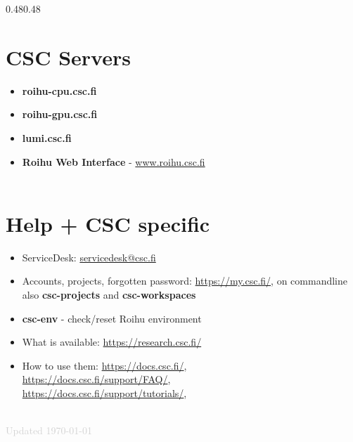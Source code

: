 \documentclass{article}
\begin{document}
\begin{Parallel}{0.48\textwidth}{0.48\textwidth}
{\section*{CSC Servers}
\begin{itemize}[itemsep=1ex,leftmargin=0cm,rightmargin=.52\textwidth]
    \item \textbf{roihu-cpu.csc.fi}
    \item \textbf{roihu-gpu.csc.fi}
    \item \textbf{lumi.csc.fi}
    \item \textbf{Roihu Web Interface} - \href{https://www.roihu.csc.fi/}{www.roihu.csc.fi}
    \\
    \\
\end{itemize}
\section*{Help + CSC specific}
\begin{itemize}[itemsep=1ex,leftmargin=0cm,rightmargin=.52\textwidth]
    \item ServiceDesk: \href{mailto:servicedesk@csc.fi}{servicedesk@csc.fi}  
    \item Accounts, projects, forgotten password: \href{https://my.csc.fi/}{https://my.csc.fi/}, on commandline also \textbf{csc-projects} and \textbf{csc-workspaces}
    \item \textbf{csc-env} - check/reset Roihu environment
    \item What is available: \href{https://research.csc.fi/}{https://research.csc.fi/}
    \item How to use them: \href{https://docs.csc.fi/}{https://docs.csc.fi/},\\
          \href{https://docs.csc.fi/support/FAQ/}{https://docs.csc.fi/support/FAQ/},\\
          \href{https://docs.csc.fi/support/tutorials/}{https://docs.csc.fi/support/tutorials/},
    \\
    \\
\end{itemize}
}
\ParallelPar
\end{Parallel}





\textcolor{lightgray}{Updated \today}
\end{document}
